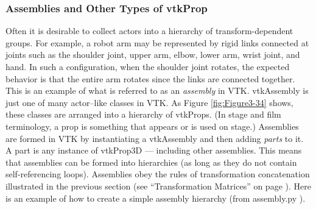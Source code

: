 \clearpage
\subsubsection{Assemblies and Other Types of vtkProp}
\label{subsubsec:assemblies_vtkprop}

Often it is desirable to collect actors into a hierarchy of transform-dependent groups. For example, a robot arm may be represented by rigid links connected at joints such as the shoulder joint, upper arm, elbow, lower arm, wrist joint, and hand. In such a configuration, when the shoulder joint rotates, the expected behavior is that the entire arm rotates since the links are connected together. This is an example of what is referred to as an \emph{assembly} in VTK. vtkAssembly is just one of many actor--like classes in VTK. As Figure \ref{fig:Figure3-34} shows, these classes are arranged into a hierarchy of vtkProps. (In stage and film terminology, a prop is something that appears or is used on stage.) Assemblies are formed in VTK by instantiating a vtkAssembly and then adding \emph{parts} to it. A part is any instance of vtkProp3D --- including other assemblies. This means that assemblies can be formed into hierarchies (as long as they do not contain self-referencing loops). Assemblies obey the rules of transformation concatenation illustrated in the previous section (see ``Transformation Matrices'' on page \pageref{subsubsec:transform_matrices} ). Here is an example of how to create a simple assembly hierarchy (from assembly.py ).

